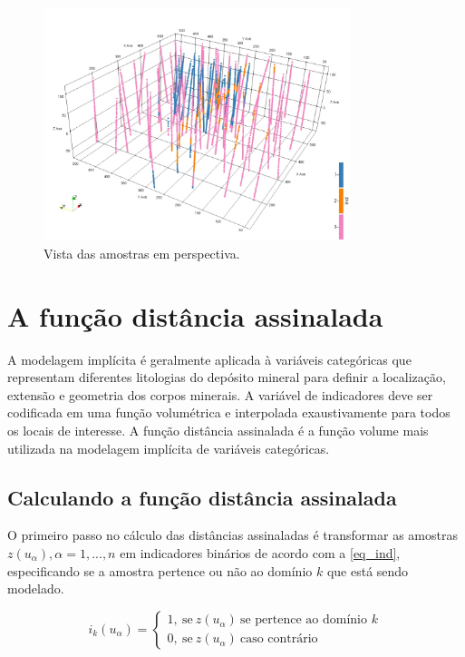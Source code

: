 \begin{figure}[H]
	\caption{\label{dataset}Vista das amostras em perspectiva.}
	\begin{center}
		\includegraphics[width=0.8\textwidth]{capitulo_2/dados.jpeg}
	\end{center}
\end{figure}

\section{A função distância assinalada}

A modelagem implícita é geralmente aplicada à variáveis categóricas que representam diferentes litologias do depósito mineral para definir a localização, extensão e geometria dos corpos minerais. A variável de indicadores deve ser codificada em uma função volumétrica e interpolada exaustivamente para todos os locais de interesse. A função distância assinalada \cite{osherlevelsetmethods}  é a função volume mais utilizada na modelagem implícita de variáveis categóricas.

\subsection{Calculando a função distância assinalada}

O primeiro passo no cálculo das distâncias assinaladas é transformar as amostras ${z(u_\alpha),\alpha=1,...,n}$ em indicadores binários de acordo com a \autoref{eq_ind}, especificando se a amostra pertence ou não ao domínio $k$ que está sendo modelado.

\begin{equation}
	i_k(u_\alpha)=\begin{cases}
	1,\:\textrm{se}\:z(u_\alpha)\:\textrm{se pertence ao domínio $k$}\\
	0,\:\textrm{se}\:z(u_\alpha)\:\textrm{caso contrário}\end{cases}
    \label{eq_ind}
\end{equation}

